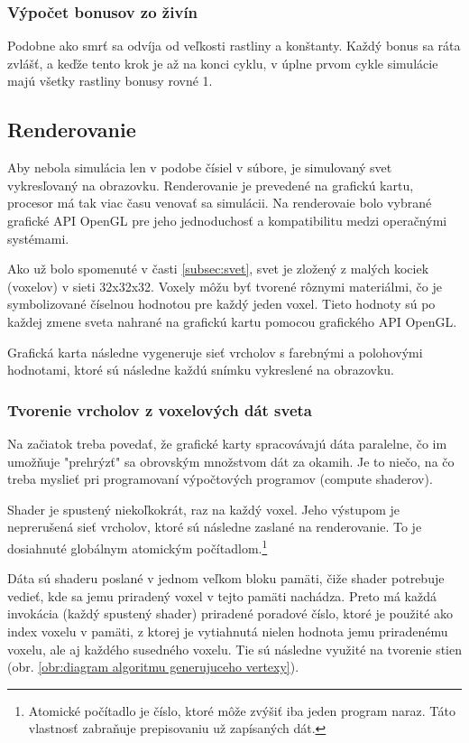 \documentclass[12pt]{article}
\begin{document}
\subsubsection{Výpočet bonusov zo živín}

Podobne ako smrť sa odvíja od veľkosti rastliny a konštanty. Každý bonus
sa ráta zvlášť, a keďže tento krok je až na konci cyklu, v úplne prvom cykle
simulácie majú všetky rastliny bonusy rovné 1.

\newpage
\subsection{Renderovanie}

Aby nebola simulácia len v podobe čísiel v súbore, je simulovaný svet
vykresľovaný na obrazovku. Renderovanie je prevedené na grafickú kartu,
procesor má tak viac času venovať sa simulácii. Na renderovaie bolo vybrané
grafické API OpenGL pre jeho jednoduchosť a kompatibilitu medzi operačnými
systémami.

Ako už bolo spomenuté v časti \ref{subsec:svet}, svet je zložený z malých
kociek (voxelov) v sieti 32x32x32. Voxely môžu byť tvorené rôznymi materiálmi,
čo je symbolizované číselnou hodnotou pre každý jeden voxel. Tieto
hodnoty sú po každej zmene sveta nahrané na grafickú kartu pomocou grafického
API OpenGL.

Grafická karta následne vygeneruje sieť vrcholov s farebnými a
polohovými hodnotami, ktoré sú následne každú snímku vykreslené na obrazovku.

\subsubsection{Tvorenie vrcholov z voxelových dát sveta}

Na začiatok treba povedať, že grafické karty spracovávajú dáta paralelne,
čo im umožňuje "prehrýzť" sa obrovským množstvom dát za okamih.
Je to niečo, na čo treba myslieť pri programovaní výpočtových programov
(compute shaderov).

Shader je spustený niekoľkokrát, raz na každý voxel. Jeho výstupom je
neprerušená sieť vrcholov, ktoré sú následne zaslané na renderovanie.
To je dosiahnuté globálnym atomickým počítadlom.\footnote
{Atomické počítadlo je číslo, ktoré môže zvýšiť iba jeden program naraz. Táto
	vlastnosť zabraňuje prepisovaniu už zapísaných dát.}

Dáta sú shaderu poslané v jednom veľkom bloku pamäti, čiže shader potrebuje
vedieť, kde sa jemu priradený voxel v tejto pamäti nachádza. Preto má každá
invokácia (každý spustený shader) priradené poradové číslo, ktoré
je použité ako index voxelu v pamäti, z ktorej je vytiahnutá nielen
hodnota jemu priradenému voxelu, ale aj každého susedného voxelu. Tie sú
následne využité na tvorenie stien
(obr. \ref{obr:diagram algoritmu generujuceho vertexy}).
\end{document}
